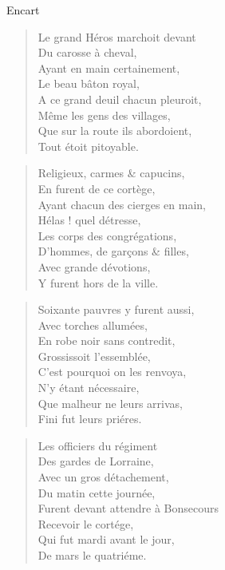 \begin{diary}{Encart}{}
        \begin{verse}Le grand Héros marchoit devant\\Du carosse à cheval,\\Ayant en main certainement,\\Le beau bâton royal,\\A ce grand deuil chacun pleuroit,\\Même les gens des villages,\\Que sur la route ils abordoient,\\Tout étoit pitoyable.\\\end{verse}
        \bigskip
        
        \begin{verse}Religieux, carmes & capucins,\\En furent de ce cortège,\\Ayant chacun des cierges en main,\\Hélas ! quel détresse,\\Les corps des congrégations,\\D'hommes, de garçons & filles,\\Avec grande dévotions,\\Y furent hors de la ville.\\\end{verse}
        \bigskip
        
        \begin{verse}Soixante pauvres y furent aussi,\\Avec torches allumées,\\En robe noir sans contredit,\\Grossissoit l'essemblée,\\C’est pourquoi on les renvoya,\\N'y étant nécessaire,\\Que malheur ne leurs arrivas,\\Fini fut leurs priéres.\\\end{verse}
        \bigskip
        
        \begin{verse}Les officiers du régiment\\Des gardes de Lorraine,\\Avec un gros détachement,\\Du matin cette journée,\\Furent devant attendre à Bonsecours\\Recevoir le cortége,\\Qui fut mardi avant le jour,\\De mars le quatriéme.\\\end{verse}
        \bigskip
        

\end{diary}
